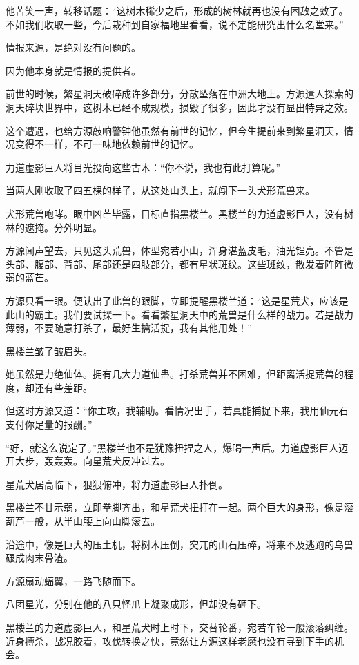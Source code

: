 \begin{this_body}
他苦笑一声，转移话题：“这树木稀少之后，形成的树林就再也没有困敌之效了。不如我们收取一些，今后栽种到自家福地里看看，说不定能研究出什么名堂来。”

情报来源，是绝对没有问题的。

因为他本身就是情报的提供者。

前世的时候，繁星洞天破碎成许多部分，分散坠落在中洲大地上。方源遣人探索的洞天碎块世界中，这树木已经不成规模，损毁了很多，因此才没有显出特异之效。

这个遭遇，也给方源敲响警钟他虽然有前世的记忆，但今生提前来到繁星洞天，情况变得不一样，不可一味地依赖前世的记忆。

力道虚影巨人将目光投向这些古木：“你不说，我也有此打算呢。”

当两人刚收取了四五棵的样子，从这处山头上，就闯下一头犬形荒兽来。

犬形荒兽咆哮。眼中凶芒毕露，目标直指黑楼兰。黑楼兰的力道虚影巨人，没有树林的遮掩。分外明显。

方源闻声望去，只见这头荒兽，体型宛若小山，浑身湛蓝皮毛，油光锃亮。不管是头部、腹部、背部、尾部还是四肢部分，都有星状斑纹。这些斑纹，散发着阵阵微弱的蓝芒。

方源只看一眼。便认出了此兽的跟脚，立即提醒黑楼兰道：“这是星荒犬，应该是此山的霸主。我们要试探一下。看看繁星洞天中的荒兽是什么样的战力。若是战力薄弱，不要随意打杀了，最好生擒活捉，我有其他用处！”

黑楼兰皱了皱眉头。

她虽然是力绝仙体。拥有几大力道仙蛊。打杀荒兽并不困难，但距离活捉荒兽的程度，却还有些差距。

但这时方源又道：“你主攻，我辅助。看情况出手，若真能捕捉下来，我用仙元石支付你足量的报酬。”

“好，就这么说定了。”黑楼兰也不是犹豫扭捏之人，爆喝一声后。力道虚影巨人迈开大步，轰轰轰。向星荒犬反冲过去。

星荒犬居高临下，狠狠俯冲，将力道虚影巨人扑倒。

黑楼兰不甘示弱，立即拳脚齐出，和星荒犬扭打在一起。两个巨大的身形，像是滚葫芦一般，从半山腰上向山脚滚去。

沿途中，像是巨大的压土机，将树木压倒，突兀的山石压碎，将来不及逃跑的鸟兽碾成肉末骨渣。

方源扇动蝠翼，一路飞随而下。

八团星光，分别在他的八只怪爪上凝聚成形，但却没有砸下。

黑楼兰的力道虚影巨人，和星荒犬时上时下，交替轮番，宛若车轮一般滚落纠缠。近身搏杀，战况胶着，攻伐转换之快，竟然让方源这样老魔也没有寻到下手的机会。


\end{this_body}
